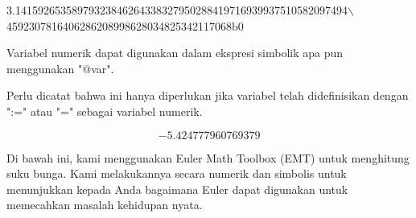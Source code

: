 \documentclass[a4paper,10pt]{article}
\begin{document}
\begin{eulernotebook}
\begin{eulercomment}
\begin{eulercomment}
\begin{eulercomment}
\begin{eulercomment}
\begin{eulercomment}
\begin{eulercomment}
\begin{euleroutput}
          3.14159265358979323846264338327950288419716939937510582097494\(\backslash\)
  4592307816406286208998628034825342117068b0
  
\end{euleroutput}
\begin{eulercomment}
Variabel numerik dapat digunakan dalam ekspresi simbolik apa pun
menggunakan "@var".

Perlu dicatat bahwa ini hanya diperlukan jika variabel telah
didefinisikan dengan ":=" atau "=" sebagai variabel numerik.
\end{eulercomment}
\begin{eulerformula}
\[
-5.424777960769379
\]
\end{eulerformula}
\begin{eulercomment}
\begin{eulercomment}
\begin{eulercomment}
Di bawah ini, kami menggunakan Euler Math Toolbox (EMT) untuk
menghitung suku bunga. Kami melakukannya secara numerik dan simbolis
untuk menunjukkan kepada Anda bagaimana Euler dapat digunakan untuk
memecahkan masalah kehidupan nyata.


\end{eulercomment}
\end{eulercomment}
\end{eulercomment}
\end{eulercomment}
\end{eulercomment}
\end{eulercomment}
\end{eulercomment}
\end{eulercomment}
\end{eulercomment}
\end{eulernotebook}
\end{document}
